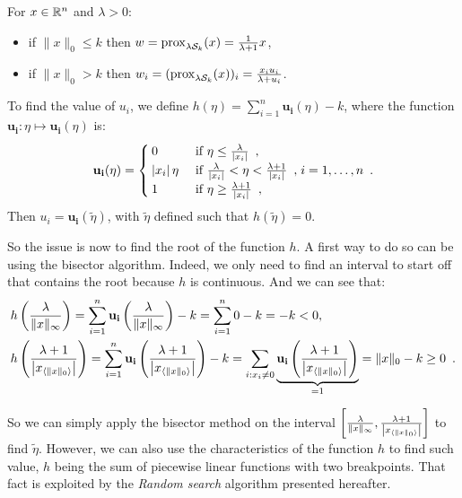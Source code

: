 \begin{theorem}\label{thm:proxval}
For $x\in\mathbb{R}^n$ and $\lambda>0$:
\begin{itemize}
    \item if $\|x\|_0\leq k$ then $w=\operatorname{prox}_{\lambda\mathcal{S}_k}(x)=\frac{1}{\lambda + 1}x$,
    \item if $\|x\|_0> k$ then $w_i=(\operatorname{prox}_{\lambda\mathcal{S}_k}(x))_i=\frac{x_iu_i}{\lambda + u_i}$.
\end{itemize}
To find the value of $u_i$, we define $h(\eta)=\sum_{i=1}^n \mathbf{u_i}(\eta) - k$, where the function $\mathbf{u_i}:\eta\mapsto\mathbf{u_i}(\eta)$ is:
\[\mathbf{u_i}(\eta)=\begin{cases}
0 & \text{ if }\eta \leq \frac{\lambda}{\left|x_i\right|}\enspace,\\
\left|x_i\right|\eta & \text{ if }\frac{\lambda}{\left|x_i\right|}< \eta < \frac{\lambda  + 1}{\left|x_i\right|}\enspace,\\
1 & \text{ if } \eta\geq \frac{\lambda+1}{\left|x_i\right|}\enspace,
\end{cases} i=1,\dots,n\enspace.
\]
Then $u_i=\mathbf{u_i}(\tilde\eta)$, with $\tilde\eta$ defined such that $h(\tilde\eta)=0$.
\end{theorem}

So the issue is now to find the root of the function $h$. A first way to do so can be using the bisector algorithm. Indeed, we only need to find an interval to start off that contains the root because $h$ is continuous. And we can see that:
\[\begin{aligned}
&h\left(\frac{\lambda}{\|x\|_\infty}\right)=\sum_{i=1}^n \mathbf{u_i}\left(\frac{\lambda}{\|x\|_\infty}\right)-k = \sum_{i=1}^n 0 -k = -k < 0,\\
&h\left(\frac{\lambda+1}{\left|x_{\langle \|x\|_0\rangle}\right|}\right) = \sum_{i=1}^n \mathbf{u_i}\left(\frac{\lambda+1}{\left|x_{\langle \|x\|_0\rangle}\right|}\right) - k = \sum_{i:x_i\neq 0}\underbrace{\mathbf{u_i}\left(\frac{\lambda+1}{\left|x_{\langle \|x\|_0\rangle}\right|}\right)}_{=1} = \|x\|_0-k \geq 0\enspace.
\end{aligned}\]

So we can simply apply the bisector method on the interval $\left[\frac{\lambda}{\|x\|_\infty}, \frac{\lambda + 1}{\left|x_{\langle \|x\|_0\rangle}\right|}\right]$ to find $\tilde\eta$. However, we can also use the characteristics of the function $h$ to find such value, $h$ being the sum of piecewise linear functions with two breakpoints. That fact is exploited by the \textit{Random search} algorithm presented hereafter.

